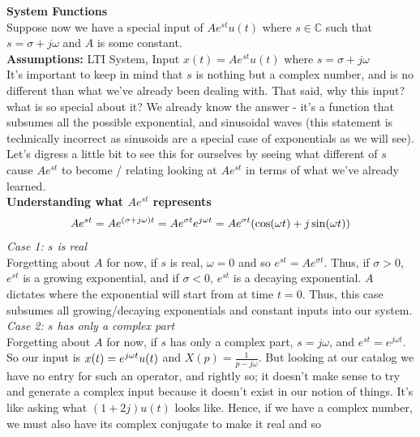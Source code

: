 \documentclass{report}
\begin{document}









\textbf{System Functions} \\
Suppose now we have a special input of $Ae^{st}u(t)$ where $s \in \mathbb{C}$ such that $s = \sigma + j\omega$ and $A$ is some constant.  \\
\textbf{Assumptions:} LTI System, Input $x(t) = Ae^{st}u(t)$ where $s = \sigma + j\omega$ \smallskip \\
It's important to keep in mind that $s$ is nothing but a complex number, and is no different than what we've already been dealing with. That said, why this input? what is so special about it? We already know the answer - it's a function that subsumes all the possible exponential, and sinusoidal waves (this statement is technically incorrect as sinusoids are a special case of exponentials as we will see). Let's digress a little bit to see this for ourselves by seeing what different of $s$ cause $Ae^{st}$ to become / relating looking at $Ae^{st}$ in terms of what we've already learned.\smallskip \\
\textbf{Understanding what $Ae^{st}$ represents}
\begin{align*}
    Ae^{st} = Ae^{(\sigma + j\omega)t} = Ae^{\sigma t}e^{j\omega t} = Ae^{\sigma t}(\cos(\omega t) + j\sin(\omega t))
\end{align*}
\textit{Case 1: $s$ is real} \\
Forgetting about $A$ for now, if $s$ is real, $\omega = 0$ and so $e^{st} = Ae^{\sigma t}$. Thus, if $\sigma > 0$, $e^{st}$ is a growing exponential, and if $\sigma < 0$, $e^{st}$ is a decaying exponential. $A$ dictates where the exponential will start from at time $t = 0$. Thus, this case subsumes all growing/decaying exponentials and constant inputs into our system. \medskip \\
\textit{Case 2: $s$ has only a complex part} \\
Forgetting about $A$ for now, if $s$ has only a complex part, $s = j\omega$, and $e^{st} = e^{j\omega t}$. So our input is $x(t) = e^{j\omega t}u(t)$ and $X(p) = \frac{1}{p - j\omega}$. But looking at our catalog we have no entry for such an operator, and rightly so; it doesn't make sense to try and generate a complex input because it doesn't exist in our notion of things. It's like asking what $(1 + 2j)u(t)$ looks like. Hence, if we have a complex number, we must also have its complex conjugate to make it real and so 
\end{document}
